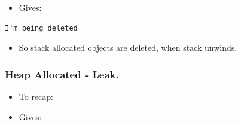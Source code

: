 \begin{Shaded}
\begin{Highlighting}[]
 
  \NormalTok{,}\NormalTok{);}
\NormalTok{\}}

\end{Highlighting}
\end{Shaded}

\begin{itemize}
\itemsep1pt\parskip0pt
\item
  Gives:
\end{itemize}

\begin{verbatim}
I'm being deleted
\end{verbatim}

\begin{itemize}
\itemsep1pt\parskip0pt
\item
  So stack allocated objects are deleted, when stack unwinds.
\end{itemize}

\subsubsection{Heap Allocated - Leak.}\label{heap-allocated---leak.}

\begin{itemize}
\itemsep1pt\parskip0pt
\item
  To recap:
\end{itemize}

\begin{Shaded}
\begin{Highlighting}[]
 
   \NormalTok{,}\NormalTok{);}
\NormalTok{\}}

\end{Highlighting}
\end{Shaded}

\begin{itemize}
\itemsep1pt\parskip0pt
\item
  Gives:
\end{itemize}

\begin{verbatim}
\end{verbatim}

